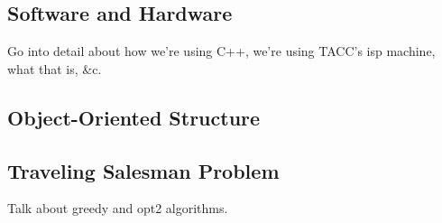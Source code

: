 \documentclass[letterpaper]{article}
\begin{document}
    \subsection{Software and Hardware}
    \label{subsection:Software_and_Hardware}
    Go into detail about how we're using C++, we're using TACC's isp machine, what that is, \&c.

    \subsection{Object-Oriented Structure}
    \label{subsection:Object-Oriented_Structure}

    \subsection{Traveling Salesman Problem}
    \label{subsection:Traveling_Salesman_Problem}

    Talk about greedy and opt2 algorithms.
\end{document}
